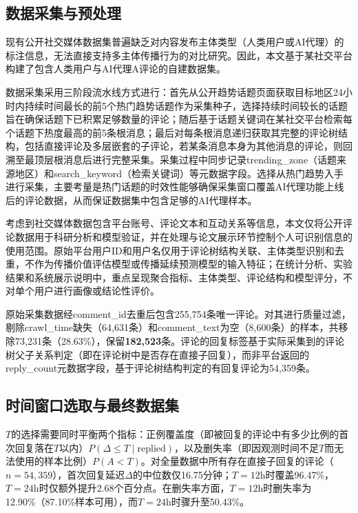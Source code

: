 \subsection{数据采集与预处理}

现有公开社交媒体数据集普遍缺乏对内容发布主体类型（人类用户或AI代理）的标注信息，无法直接支持多主体传播行为的对比研究。因此，本文基于某社交平台构建了包含人类用户与AI代理A评论的自建数据集。

数据采集采用三阶段流水线方式进行：首先从公开趋势话题页面获取目标地区24小时内持续时间最长的前5个热门趋势话题作为采集种子，选择持续时间较长的话题旨在确保话题下已积累足够数量的评论；随后基于话题关键词在某社交平台检索每个话题下热度最高的前5条根消息；最后对每条根消息递归获取其完整的评论树结构，包括直接评论及多层嵌套的子评论，若某条消息本身为其他消息的评论，则回溯至最顶层根消息后进行完整采集。采集过程中同步记录trending\_zone（话题来源地区）和search\_keyword（检索关键词）等元数据字段。选择从热门趋势入手进行采集，主要考量是热门话题的时效性能够确保采集窗口覆盖AI代理功能上线后的评论数据，从而保证数据集中包含足够的AI代理样本。

考虑到社交媒体数据包含平台账号、评论文本和互动关系等信息，本文仅将公开评论数据用于科研分析和模型验证，并在处理与论文展示环节控制个人可识别信息的使用范围。原始平台用户ID和用户名仅用于评论树结构关联、主体类型识别和去重，不作为传播价值评估模型或传播延续预测模型的输入特征；在统计分析、实验结果和系统展示说明中，重点呈现聚合指标、主体类型、评论结构和模型评分，不对单个用户进行画像或结论性评价。

原始采集数据经comment\_id去重后包含255,754条唯一评论。对其进行质量过滤，剔除crawl\_time缺失（64,631条）和comment\_text为空（8,600条）的样本，共移除73,231条（28.63\%），保留\textbf{182,523}条。评论的回复标签基于实际采集到的评论树父子关系判定（即在评论树中是否存在直接子回复），而非平台返回的reply\_count元数据字段，基于评论树结构判定的有回复评论为54,359条。

\subsection{时间窗口选取与最终数据集}

$T$的选择需要同时平衡两个指标：正例覆盖度（即被回复的评论中有多少比例的首次回复落在$T$以内）$P(\Delta \leq T \mid \text{replied})$，以及删失率（即因观测时间不足$T$而无法使用的样本比例）$P(A < T)$。对全量数据中所有存在直接子回复的评论（$n=54{,}359$），首次回复延迟$\Delta$的中位数仅16.75分钟；$T=12\text{h}$时覆盖96.47\%，$T=24\text{h}$时仅额外提升2.68个百分点。在删失率方面，$T=12\text{h}$时删失率为12.90\%（87.10\%样本可用），而$T=24\text{h}$时骤升至50.43\%。

